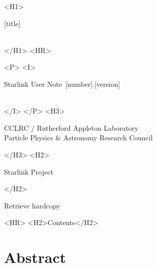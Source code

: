 \documentclass[twoside,11pt]{article}
\newcommand{\stardoccategory}  {Starlink User Note}
\newcommand{\stardocsource}    {sun\stardocnumber}
\newcommand{\stardocnumber}    {[number].[version]}
\newcommand{\stardocauthors}   {[author]}
\newcommand{\stardocdate}      {[date]}
\newcommand{\stardoctitle}     {[title]}
\newcommand{\stardocversion}   {[software-version]}
\newcommand{\stardocmanual}    {[manual-type]}
\newcommand{\htmladdnormallink}[2]{#1}
\newcommand{\htmladdimg}[1]{}
\newcommand{\htmlref}[2]{#1}
\newcommand{\htmladdtonavigation}[1]{}
\newcommand{\xlabel}[1]{}
\renewcommand{\_}{\texttt{\symbol{95}}}
\begin{document}
\begin{htmlonly}
   \xlabel{}
   \begin{rawhtml} <H1> \end{rawhtml}
      \stardoctitle\\
      \stardocversion\\
      \stardocmanual
   \begin{rawhtml} </H1> <HR> \end{rawhtml}


   \begin{rawhtml} <P> <I> \end{rawhtml}
   \stardoccategory\ \stardocnumber \\
   \stardocauthors \\
   \stardocdate
   \begin{rawhtml} </I> </P> <H3> \end{rawhtml}
      \htmladdnormallink{CCLRC / Rutherford Appleton Laboratory}
                        {http://www.cclrc.ac.uk} \\
      \htmladdnormallink{Particle Physics \& Astronomy Research Council}
                        {http://www.pparc.ac.uk} \\
   \begin{rawhtml} </H3> <H2> \end{rawhtml}
      \htmladdnormallink{Starlink Project}{http://www.starlink.rl.ac.uk/}
   \begin{rawhtml} </H2> \end{rawhtml}
   \htmladdnormallink{\htmladdimg{source.gif} Retrieve hardcopy}
      {http://www.starlink.rl.ac.uk/cgi-bin/hcserver?\stardocsource}\\

  \label{stardoccontents}
  \begin{rawhtml} 
    <HR>
    <H2>Contents</H2>
  \end{rawhtml}
  \htmladdtonavigation{\htmlref{\htmladdimg{contents_motif.gif}}
        {stardoccontents}}

  \section{\xlabel{abstract}Abstract}
\end{htmlonly}
\end{document}
